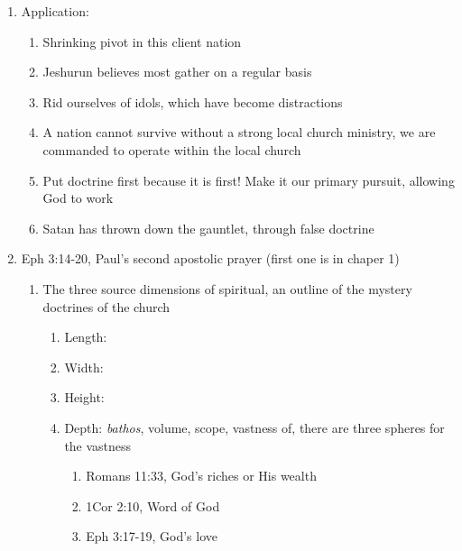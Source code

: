 \documentclass[11pt]{article}
\begin{document}
\begin{enumerate}
	\item Application:
	\begin{enumerate}
		\item Shrinking pivot in this client nation
		\item Jeshurun believes most gather on a regular basis
		\item Rid ourselves of idols, which have become distractions
		\item A nation cannot survive without a strong local church ministry, we are commanded to operate within the local church
		\item Put doctrine first because it is first! Make it our primary pursuit, allowing God to work
		\item Satan has thrown down the gauntlet, through false doctrine
	\end{enumerate}

	\item Eph 3:14-20, Paul's second apostolic prayer (first one is in chaper 1)
	\begin{enumerate}
		\item The three source dimensions of spiritual, an outline of the mystery doctrines of the church
		\begin{enumerate}
			\item Length:
			\item Width:
			\item Height:
			\item Depth: \emph{bathos}, volume, scope, vastness of, there are three spheres for the vastness
			\begin{enumerate}
				\item Romans 11:33, God's riches or His wealth
				\item 1Cor 2:10, Word of God
				\item Eph 3:17-19, God's love
			\end{enumerate}
		\end{enumerate}
	\end{enumerate}
\end{enumerate}
\end{document}
